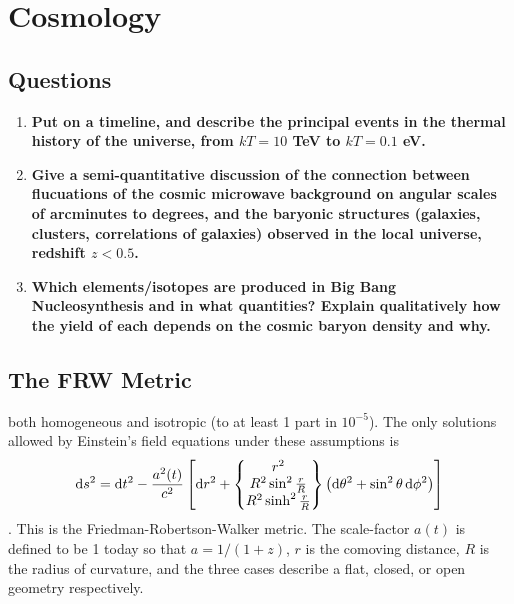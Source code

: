 \section{Cosmology}
\subsection{Questions}
\begin{enumerate}
\item \textbf{Put on a timeline, and describe the principal events in the thermal history of the
universe, from $kT = 10$ TeV to $kT = 0.1$ eV.}
\item \textbf{Give a semi-quantitative discussion of the connection between flucuations of the
cosmic microwave background on angular scales of arcminutes to degrees, and the
baryonic structures (galaxies, clusters, correlations of galaxies) observed in the local
universe, redshift $z < 0.5$.}
\item \textbf{Which elements/isotopes are produced in Big Bang Nucleosynthesis and in what
quantities? Explain qualitatively how the yield of each depends on the cosmic baryon
density and why.}
\end{enumerate}

\subsection{The FRW Metric}
 both homogeneous and isotropic (to at least 1 part in $10^{-5}$).
The only solutions allowed by Einstein's field equations under these assumptions is
\begin{dmath}
\d s^2 = \d t^2 - \frac{a^2(t)}{c^2}\left[\d r^2 + 
    \left\{\begin{matrix}
        r^2 \\ R^2\sin^2\frac{r}{R} \\ R^2\sinh^2\frac{r}{R} \\
    \end{matrix}\right\} \left(\d\theta^2 + \sin^2\theta\,\d\phi^2\right)\right]
\end{dmath}.
This is the Friedman-Robertson-Walker metric.  The scale-factor $a(t)$ is defined to be
1 today so that $a = 1/(1+z)$,
$r$ is the comoving distance, $R$ is the radius of curvature, and the three cases
describe a flat, closed, or open geometry respectively.

